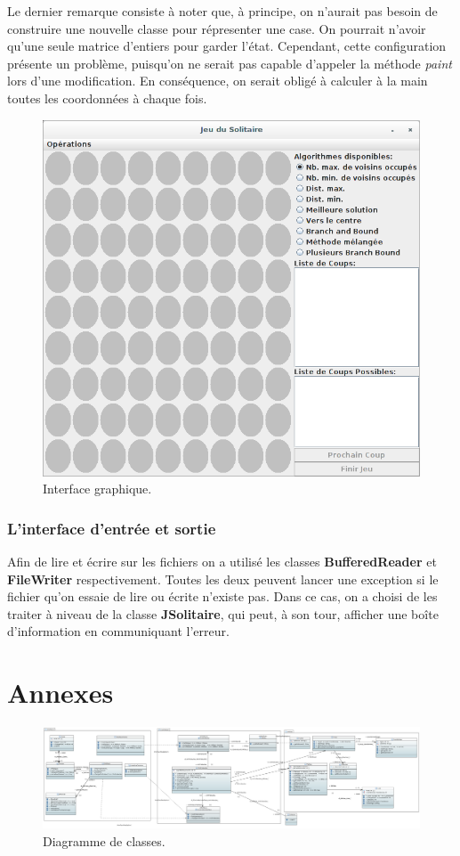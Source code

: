 \documentclass{article}
\begin{document}
\vspace{12pt}

Le dernier remarque consiste à noter que, à principe, on n'aurait pas besoin de
construire une nouvelle classe pour répresenter une case. On pourrait n'avoir
qu'une seule matrice d'entiers pour garder l'état. Cependant, cette
configuration présente un problème, puisqu'on ne serait pas capable d'appeler la
méthode \textit{paint} lors d'une modification. En conséquence, on serait obligé
à calculer \og à la main \fg toutes les coordonnées à chaque fois. 
 
\begin{figure}[h]
\centering
\includegraphics[scale=0.35]{images/screen}
\caption{Interface graphique.}
\label{fig:screen}
\end{figure}

\subsubsection {L'interface d'entrée et sortie}

Afin de lire et écrire sur les fichiers on a utilisé les classes
\textbf{BufferedReader} et \textbf{FileWriter} respectivement. Toutes les deux
peuvent lancer une exception si le fichier qu'on essaie de lire ou
écrite n'existe pas. Dans ce cas, on a choisi de les traiter à niveau de la
classe \textbf{JSolitaire}, qui peut, à son tour, afficher une boîte
d'information en communiquant l'erreur.

\newpage
\section{Annexes}

\begin{figure}[h]
\centering
\includegraphics[angle=-90, scale=0.19]{images/diagramme_classes}
\caption{Diagramme de classes.}
\label{fig:diagramme_classes}
\end{figure}
\end{document}
